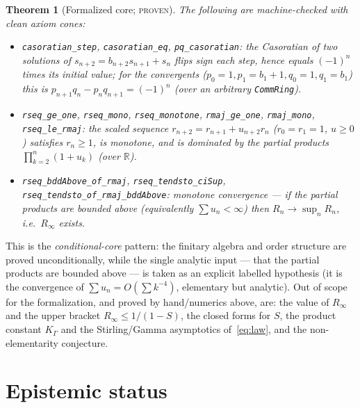 \documentclass[11pt]{article}
\newtheorem{theorem}{Theorem}
\newcommand{\R}{\mathbb{R}}
\newcommand{\Rinf}{R_\infty}
\begin{document}
\begin{theorem}[Formalized core; \textsc{proven}]\label{thm:lean}
The following are machine-checked with clean axiom cones:
\begin{itemize}
\item \texttt{casoratian\_step}, \texttt{casoratian\_eq}, \texttt{pq\_casoratian}:
the Casoratian of two solutions of $s_{n+2}=b_{n+2}s_{n+1}+s_n$ flips sign each
step, hence equals $(-1)^n$ times its initial value; for the convergents
($p_0{=}1,p_1{=}b_1{+}1,q_0{=}1,q_1{=}b_1$) this is
$p_{n+1}q_n-p_nq_{n+1}=(-1)^n$ (over an arbitrary \texttt{CommRing}).
\item \texttt{rseq\_ge\_one}, \texttt{rseq\_mono}, \texttt{rseq\_monotone},
\texttt{rmaj\_ge\_one}, \texttt{rmaj\_mono}, \texttt{rseq\_le\_rmaj}: the scaled
sequence $r_{n+2}=r_{n+1}+u_{n+2}r_n$ ($r_0{=}r_1{=}1$, $u\ge0$) satisfies
$r_n\ge1$, is monotone, and is dominated by the partial products
$\prod_{k=2}^n(1+u_k)$ (over $\R$).
\item \texttt{rseq\_bddAbove\_of\_rmaj}, \texttt{rseq\_tendsto\_ciSup},
\texttt{rseq\_tendsto\_of\_rmaj\_bddAbove}: monotone convergence --- if the partial
products are bounded above (equivalently $\sum u_n<\infty$) then $R_n\to\sup_nR_n$,
i.e.\ $\Rinf$ exists.
\end{itemize}
\end{theorem}

This is the \emph{conditional-core} pattern: the finitary algebra and order
structure are proved unconditionally, while the single analytic input --- that the
partial products are bounded above --- is taken as an explicit labelled hypothesis
(it is the convergence of $\sum u_n=O(\sum k^{-4})$, elementary but analytic). Out
of scope for the formalization, and proved by hand/numerics above, are: the value of
$\Rinf$ and the upper bracket $\Rinf\le1/(1-S)$, the closed forms for $S$, the
product constant $K_\Gamma$ and the Stirling/Gamma asymptotics of~\eqref{eq:law},
and the non-elementarity conjecture.

\section{Epistemic status}\label{sec:status}
\end{document}
